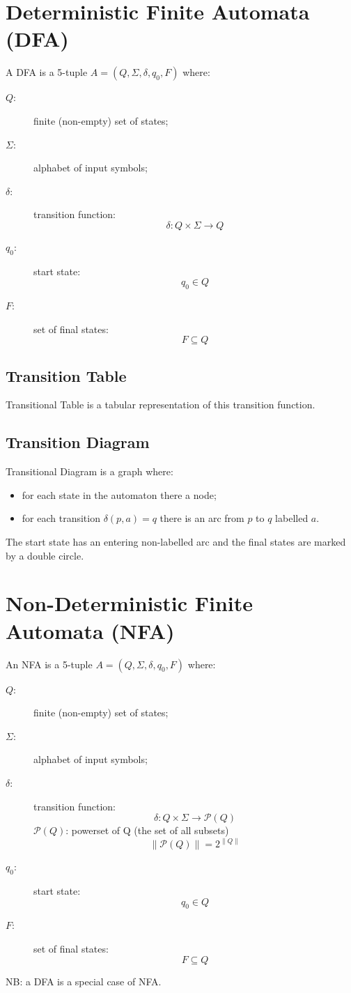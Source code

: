 \section{Deterministic Finite Automata (DFA)}
A DFA is a 5-tuple $A = (Q, \Sigma, \delta, q_0, F)$ where:
\begin{description}
	\item[$Q:$] finite (non-empty) set of states;
	\item[$\Sigma:$] alphabet of input symbols;
	\item[$\delta:$] transition function:
		$$
			\delta: Q \times \Sigma \to Q
		$$
	\item[$q_0:$] start state:
		$$
			q_0 \in Q
		$$
	\item[$F:$] set of final states:
		$$
			F \subseteq Q
		$$
\end{description}

\subsection{Transition Table}
Transitional Table is a tabular representation of this transition function.

\subsection{Transition Diagram}
Transitional Diagram is a graph where:
\begin{itemize}
	\item for each state in the automaton there a node;
	\item for each transition $\delta(p, a) = q$ there is an arc from $p$ to $q$ labelled $a$.
\end{itemize}
The start state has an entering non-labelled arc and the final states are marked by a double circle.

\section{Non-Deterministic Finite Automata (NFA)}
An NFA is a 5-tuple $A = (Q, \Sigma, \delta, q_0, F)$ where:
\begin{description}
	\item[$Q:$] finite (non-empty) set of states;
	\item[$\Sigma:$] alphabet of input symbols;
	\item[$\delta:$] transition function:
		$$
			\delta: Q \times \Sigma \to \mathscr{P}(Q)
		$$
		$\mathscr{P}(Q)$: powerset of Q (the set of all subsets)
		$$
			\|\mathscr{P}(Q)\| = 2^{\|Q\|}
		$$
	\item[$q_0:$] start state:
		$$
			q_0 \in Q
		$$
	\item[$F:$] set of final states:
		$$
			F \subseteq Q
		$$
\end{description}
NB: a DFA is a special case of NFA.

